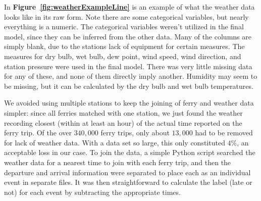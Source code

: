 \documentclass[11pt]{article} %
\begin{document}
In \textbf{Figure~\ref{fig:weatherExampleLine}} is an example of what the weather
data looks like in its raw form. Note there are some categorical variables, but
nearly everything is a numeric. The categorical variables weren't utilized in the
final model, since they can be inferred from the other data. Many of the columns
are simply blank, due to the stations lack of equipment for certain measures. 
The measures for dry bulb, wet bulb, dew point, wind speed, wind direction, and
station pressure were used in the final model. There was very little missing data
for any of these, and none of them directly imply another. Humidity may seem to 
be missing, but it can be calculated by the dry bulb and wet bulb temperatures.

We avoided using multiple stations to keep the joining of ferry and weather 
data simpler: since all ferries matched with one station, we just found the 
weather recording closest (within at least an hour) of the actual time reported
on the ferry trip. Of the over $340,000$ ferry trips, only about $13,000$ had to 
be removed for lack of weather data.  With a data set so large, this only 
constituted $4\%$, an acceptable loss in our case. To join the data, a simple
Python script searched the weather data for a nearest time to join with each
ferry trip, and then the departure and arrival information were separated to
place each as an individual event in separate files. It was then straightforward
to calculate the label (late or not) for each event by subtracting the appropriate
times.
\end{document}
